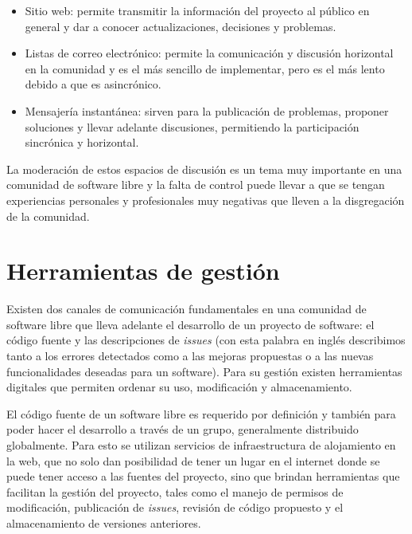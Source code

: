 \begin{itemize}
     \item Sitio web: permite transmitir la información del proyecto al público en general y dar a conocer actualizaciones, decisiones y problemas.
     \item Listas de correo electrónico: permite la comunicación y discusión horizontal en la comunidad y es el más sencillo de implementar, pero es el más lento debido a que es asincrónico.
     \item Mensajería instantánea: sirven para la publicación de problemas, proponer soluciones y llevar adelante discusiones, permitiendo la participación sincrónica y horizontal.
\end{itemize}

La moderación de estos espacios de discusión es un tema muy importante en una comunidad de software libre y la falta de control puede llevar a que se tengan experiencias personales y profesionales muy negativas que lleven a la disgregación de la comunidad.

\section{Herramientas de gestión}

Existen dos canales de comunicación fundamentales en una comunidad de software libre que lleva adelante el desarrollo de un proyecto de software: el código fuente y las descripciones de \emph{issues} (con esta palabra en inglés describimos tanto a los errores detectados como a las mejoras propuestas o a las  nuevas funcionalidades deseadas para un software). Para su gestión existen herramientas digitales que permiten ordenar su uso, modificación y almacenamiento.

El código fuente de un software libre es requerido por definición y también para poder hacer el desarrollo a través de un grupo, generalmente distribuido globalmente. Para esto se utilizan servicios de infraestructura de alojamiento en la web, que no solo dan posibilidad de tener un lugar en el internet donde se puede tener acceso a las fuentes del proyecto, sino que brindan herramientas que facilitan la gestión del proyecto, tales como el manejo de permisos de modificación, publicación de \emph{issues}, revisión de código propuesto y el almacenamiento de versiones anteriores.

